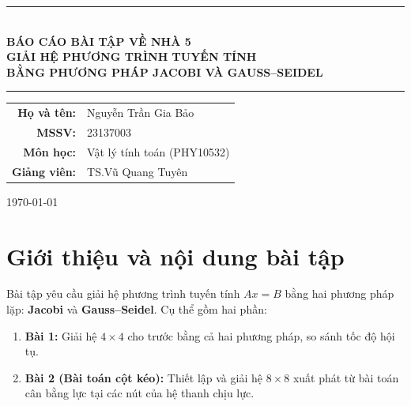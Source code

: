 \documentclass[12pt,a4paper]{article}
\begin{document}
\begin{titlepage}
    \centering
    \vspace*{2cm}

    \rule{\textwidth}{1pt} \\[0.5cm]
    {\huge \textbf{BÁO CÁO BÀI TẬP VỀ NHÀ 5}} \\[0.4cm]
    {\large \textbf{GIẢI HỆ PHƯƠNG TRÌNH TUYẾN TÍNH}} \\[0.2cm]
    {\large \textbf{BẰNG PHƯƠNG PHÁP JACOBI VÀ GAUSS--SEIDEL}} \\[0.2cm]
    \rule{\textwidth}{1pt}

    \vspace{2cm}

    {\large
    \begin{tabular}{rl}
        \textbf{Họ và tên:}  & Nguyễn Trần Gia Bảo \\[4pt]
        \textbf{MSSV:}       & 23137003 \\[4pt]
        \textbf{Môn học:}    & Vật lý tính toán (PHY10532) \\[4pt]
        \textbf{Giảng viên:} & TS.\@ Vũ Quang Tuyên \\
    \end{tabular}
    }

    \vfill
    {\large \today}
\end{titlepage}

\newpage
\tableofcontents
\newpage

\section{Giới thiệu và nội dung bài tập}

Bài tập yêu cầu giải hệ phương trình tuyến tính $Ax = B$ bằng hai phương pháp lặp: \textbf{Jacobi} và \textbf{Gauss--Seidel}. Cụ thể gồm hai phần:

\begin{enumerate}
    \item \textbf{Bài 1:} Giải hệ $4\times 4$ cho trước bằng cả hai phương pháp, so sánh tốc độ hội tụ.
    \item \textbf{Bài 2 (Bài toán cột kéo):} Thiết lập và giải hệ $8\times 8$ xuất phát từ bài toán cân bằng lực tại các nút của hệ thanh chịu lực.
\end{enumerate}
\end{document}
